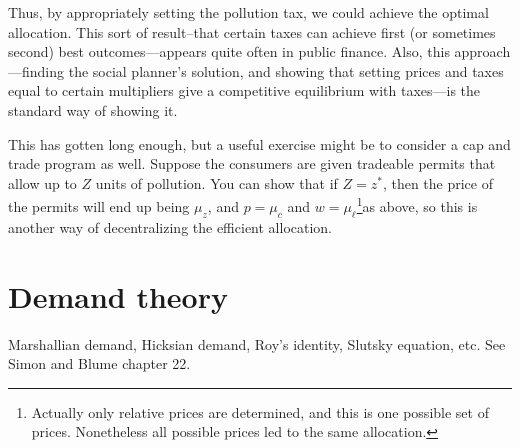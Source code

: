 \documentclass[12pt,reqno]{amsart}
\theoremstyle{definition}
\begin{document}
Thus, by appropriately setting the pollution tax, we could achieve the
optimal allocation. This sort of result--that certain taxes can
achieve first (or sometimes second) best outcomes---appears quite
often in public finance. Also, this approach---finding the social
planner's solution, and showing that setting prices and taxes equal to
certain multipliers give a competitive equilibrium with taxes---is the
standard way of showing it.

This has gotten long enough, but a useful exercise might be to
consider a cap and trade program as well. Suppose the consumers are
given tradeable permits that allow up to $Z$ units of pollution. You
can show that if $Z = z^*$, then the price of the permits will end up
being $\mu_z$, and $p=\mu_c$ and $w=\mu_\ell$\footnote{Actually only
  relative prices are determined, and this is one possible set of
  prices. Nonetheless all possible prices led to the same
  allocation.}as above, so this is another way of decentralizing the
efficient allocation.  

\section{Demand theory}

Marshallian demand, Hicksian demand, Roy's identity, Slutsky equation,
etc. See Simon and Blume chapter 22. 
\end{document}
